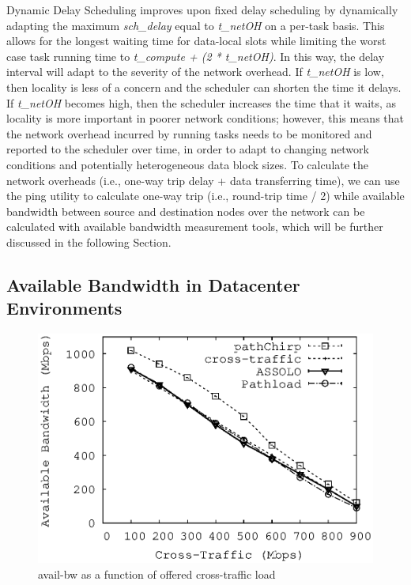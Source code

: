 Dynamic Delay Scheduling improves upon fixed delay scheduling by dynamically adapting the maximum 
\textit{sch\_delay} equal to \textit{t\_netOH} on a per-task basis. This allows 
for the longest waiting time for data-local slots while limiting the worst case task 
running time to \textit{t\_compute + (2 * t\_netOH)}. In this way, the delay interval
will adapt to the severity of the network overhead. If \textit{t\_netOH} is low, then locality
is less of a concern and the scheduler can shorten the time it delays. If \textit{t\_netOH} becomes high,
then the scheduler increases the time that it waits, as locality is more important in poorer network
conditions; however, this means that the 
network overhead incurred by running tasks needs to be monitored and reported to the 
scheduler over time, in order to adapt to changing network conditions and potentially 
heterogeneous data block sizes. To calculate the network overheads (i.e., one-way trip delay + data transferring time), we can use the ping utility to calculate one-way trip (i.e., round-trip time / 2) while available bandwidth between source and destination nodes over the network can be calculated with available bandwidth measurement tools, which will be further discussed in the following Section.


\subsection{Available Bandwidth in Datacenter Environments}\label{sec:band}


\begin{figure}[t]
		\includegraphics[width=\linewidth]{./figures/avail-bw.eps}
		\caption{avail-bw as a function of offered cross-traffic load}
		\label{fig:avail-bw}
	\endminipage \hfill
\end{figure}

